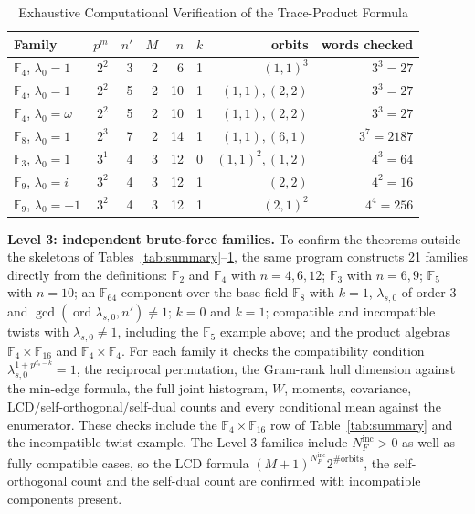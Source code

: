 \documentclass[preprint,12pt,a4paper]{elsarticle}
\newcommand{\F}{\mathbb F}
\theoremstyle{definition}
\theoremstyle{remark}
\begin{document}
\begin{table}[!t]
\centering
\scriptsize
\setlength{\tabcolsep}{2.5pt}
\caption{Exhaustive Computational Verification of the Trace-Product Formula}
\label{tab:verification}
\begin{tabular}{lrrrrlrr}
\toprule
Family & $p^m$ & $n'$ & $M$ & $n$ & $k$ & orbits & words checked\\
\midrule
$\F_4$, $\lambda_0=1$ & $2^2$ & 3 & 2 & 6  & 1 & $(1,1)^3$          & $3^3=27$\\
$\F_4$, $\lambda_0=1$ & $2^2$ & 5 & 2 & 10 & 1 & $(1,1),(2,2)$      & $3^3=27$\\
$\F_4$, $\lambda_0=\omega$ & $2^2$ & 5 & 2 & 10 & 1 & $(1,1),(2,2)$ & $3^3=27$\\
$\F_8$, $\lambda_0=1$ & $2^3$ & 7 & 2 & 14 & 1 & $(1,1),(6,1)$      & $3^7=2187$\\
$\F_3$, $\lambda_0=1$ & $3^1$ & 4 & 3 & 12 & 0 & $(1,1)^2,(1,2)$    & $4^3=64$\\
$\F_9$, $\lambda_0=i$ & $3^2$ & 4 & 3 & 12 & 1 & $(2,2)$            & $4^2=16$\\
$\F_9$, $\lambda_0=-1$ & $3^2$ & 4 & 3 & 12 & 1 & $(2,1)^2$         & $4^4=256$\\
\bottomrule
\end{tabular}
\end{table}

\noindent\textbf{Level 3: independent brute-force families.}  To confirm the
theorems outside the skeletons of Tables~\ref{tab:summary}--\ref{tab:verification},
the same program constructs 21 families directly from the definitions:
$\F_2$ and $\F_4$ with $n=4,6,12$; $\F_3$ with $n=6,9$; $\F_5$ with $n=10$;
an $\F_{64}$ component over the base field $\F_8$ with $k=1$,
$\lambda_{s,0}$ of order $3$ and
$\gcd(\operatorname{ord}\lambda_{s,0},n')\neq1$; $k=0$ and $k=1$;
compatible and incompatible twists with $\lambda_{s,0}\neq1$, including the
$\F_5$ example above; and the product algebras $\F_4\times\F_{16}$ and
$\F_4\times\F_4$.  For each family it checks the compatibility condition
$\lambda_{s,0}^{1+p^{d_s-k}}=1$, the reciprocal permutation, the Gram-rank
hull dimension against the min-edge formula, the full joint histogram, $W$,
moments, covariance, LCD/self-orthogonal/self-dual counts and every conditional
mean against the enumerator.  These checks include the $\F_4\times\F_{16}$ row
of Table~\ref{tab:summary} and the incompatible-twist example.  The Level-3
families include $N_F^{\mathrm{inc}}>0$ as well as fully compatible cases, so
the LCD formula $(M+1)^{N_F^{\mathrm{inc}}}2^{\#\mathrm{orbits}}$, the
self-orthogonal count and the self-dual count are confirmed with incompatible
components present.
\end{document}
